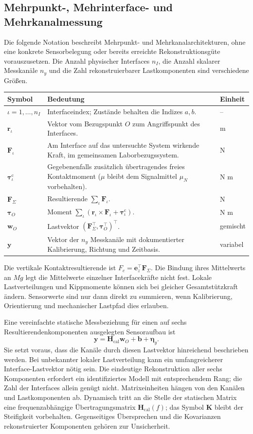 \documentclass[11pt,a4paper]{article}
\makeatletter
\newenvironment{symtab}{\begin{longtable}{@{}L{.22\textwidth}L{.62\textwidth}L{.12\textwidth}@{}}\toprule\textbf{Symbol}&\textbf{Bedeutung}&\textbf{Einheit}\\\midrule\endhead}{\bottomrule\end{longtable}}
\makeatother
\begin{document}
\subsection{Mehrpunkt-, Mehrinterface- und Mehrkanalmessung}\label{sec:mehrkanal}
Die folgende Notation beschreibt Mehrpunkt- und Mehrkanalarchitekturen, ohne eine konkrete Sensorbelegung oder bereits erreichte Rekonstruktionsgüte vorauszusetzen. Die Anzahl physischer Interfaces $n_I$, die Anzahl skalarer Messkanäle $n_y$ und die Zahl rekonstruierbarer Lastkomponenten sind verschiedene Größen.
\begin{symtab}
$\iota=1,\ldots,n_I$&Interfaceindex; Zustände behalten die Indizes $a,b$.&--\\
$\mathbf r_\iota$&Vektor vom Bezugspunkt $O$ zum Angriffspunkt des Interfaces.&m\\
$\mathbf F_\iota$&Am Interface auf das untersuchte System wirkende Kraft, im gemeinsamen Laborbezugssystem.&N\\
$\boldsymbol\tau^{\mathrm c}_\iota$&Gegebenenfalls zusätzlich übertragendes freies Kontaktmoment ($\mu$ bleibt dem Signalmittel $\mu_N$ vorbehalten).&N m\\
$\mathbf F_\Sigma$&Resultierende $\sum_\iota\mathbf F_\iota$.&N\\
$\boldsymbol\tau_O$&Moment $\sum_\iota(\mathbf r_\iota\times\mathbf F_\iota+\boldsymbol\tau^{\mathrm c}_\iota)$.&N m\\
$\mathbf w_O$&Lastvektor $(\mathbf F_\Sigma^\top,\boldsymbol\tau_O^\top)^\top$.&gemischt\\
$\mathbf y$&Vektor der $n_y$ Messkanäle mit dokumentierter Kalibrierung, Richtung und Zeitbasis.&variabel\\
\end{symtab}
Die vertikale Kontaktresultierende ist $F_c=\mathbf e_z^\top\mathbf F_\Sigma$. Die Bindung ihres Mittelwerts an $Mg$ legt die Mittelwerte einzelner Interfacekräfte nicht fest. Lokale Lastverteilungen und Kippmomente können sich bei gleicher Gesamtstützkraft ändern. Sensorwerte sind nur dann direkt zu summieren, wenn Kalibrierung, Orientierung und mechanischer Lastpfad dies erlauben.

Eine vereinfachte statische Messbeziehung für einen auf sechs Resultierendenkomponenten ausgelegten Sensoraufbau ist
\[
\mathbf y=\mathbf H_{\mathrm{cal}}\mathbf w_O+\mathbf b+\boldsymbol\eta_y.
\]
Sie setzt voraus, dass die Kanäle durch diesen Lastvektor hinreichend beschrieben werden. Bei unbekannter lokaler Lastverteilung kann ein umfangreicherer Interface-Lastvektor nötig sein. Die eindeutige Rekonstruktion aller sechs Komponenten erfordert ein identifiziertes Modell mit entsprechendem Rang; die Zahl der Interfaces allein genügt nicht. Matrixeinheiten hängen von den Kanälen und Lastkomponenten ab. Dynamisch tritt an die Stelle der statischen Matrix eine frequenzabhängige Übertragungsmatrix $\mathbf H_{\mathrm{cal}}(f)$; das Symbol $\mathbf K$ bleibt der Steifigkeit vorbehalten. Gegenseitiges Übersprechen und die Kovarianzen rekonstruierter Komponenten gehören zur Unsicherheit.
\end{document}
